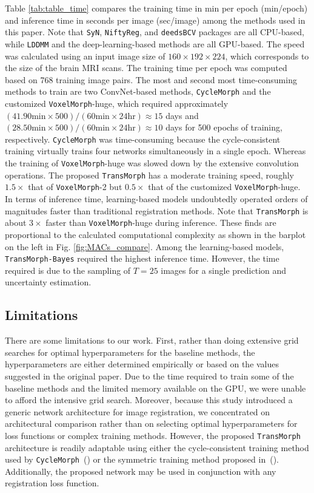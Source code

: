 \documentclass[times,twocolumn,final]{elsarticle}
\begin{document}
Table \ref{tab:table_time} compares the training time in min per epoch (min/epoch) and inference time in seconds per image (sec/image) among the methods used in this paper. Note that  \texttt{SyN}, \texttt{NiftyReg}, and \texttt{deedsBCV} packages are all CPU-based, while \texttt{LDDMM} and the deep-learning-based methods are all GPU-based. The speed was calculated using an input image size of $160\times192\times224$, which corresponds to the size of the brain MRI scans. The training time per epoch was computed based on 768 training image pairs. The most and second most time-consuming methods to train are two ConvNet-based methods, \texttt{CycleMorph} and the customized \texttt{VoxelMorph}-huge, which required approximately $(41.90\text{min}\times500)/(60\text{min}\times24 \text{hr})\approx15$ days and $(28.50\text{min}\times500)/(60\text{min}\times24 \text{hr})\approx10$ days for 500 epochs of training, respectively. \texttt{CycleMorph} was time-consuming because the cycle-consistent training virtually trains four networks simultaneously in a single epoch. Whereas the training of \texttt{VoxelMorph}-huge was slowed down by the extensive convolution operations. The proposed \texttt{TransMorph} has a moderate training speed, roughly $1.5\times$ that of \texttt{VoxelMorph}-2 but $0.5\times$ that of the customized \texttt{VoxelMorph}-huge. In terms of inference time, learning-based models undoubtedly operated orders of magnitudes faster than traditional registration methods. Note that \texttt{TransMorph} is about $3\times$ faster than \texttt{VoxelMorph}-huge during inference. These finds are proportional to the calculated computational complexity as shown in the barplot on the left in Fig. \ref{fig:MACs_compare}. Among the learning-based models, \texttt{TransMorph-Bayes} required the highest inference time. However, the time required is due to the sampling of $T=25$ images for a single prediction and uncertainty estimation.

\subsection{Limitations}
There are some limitations to our work. First, rather than doing extensive grid searches for optimal hyperparameters for the baseline methods, the hyperparameters are either determined empirically or based on the values suggested in the original paper. Due to the time required to train some of the baseline methods and the limited memory available on the GPU, we were unable to afford the intensive grid search. Moreover, because this study introduced a generic network architecture for image registration, we concentrated on architectural comparison rather than on selecting optimal hyperparameters for loss functions or complex training methods. However, the proposed \texttt{TransMorph} architecture is readily adaptable using either the cycle-consistent training method used by \texttt{CycleMorph}~(\cite{kim2021cyclemorph}) or the symmetric training method proposed in~(\cite{mok2020fast}). Additionally, the proposed network may be used in conjunction with any registration loss function. 
\end{document}
